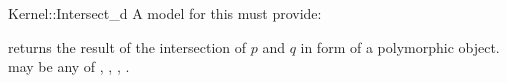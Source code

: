 \begin{ccRefFunctionObjectConcept}{Kernel::Intersect_d}
A model for this must provide:


{returns the result of the intersection of $p$ and $q$ in form of
a polymorphic object.  may be any of
, , ,
.}

\end{ccRefFunctionObjectConcept}
